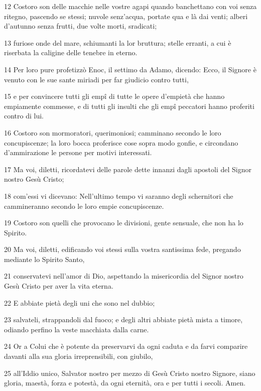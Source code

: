 \par 12 Costoro son delle macchie nelle vostre agapi quando banchettano con voi senza ritegno, pascendo se stessi; nuvole senz'acqua, portate qua e là dai venti; alberi d'autunno senza frutti, due volte morti, sradicati;
\par 13 furiose onde del mare, schiumanti la lor bruttura; stelle erranti, a cui è riserbata la caligine delle tenebre in eterno.
\par 14 Per loro pure profetizzò Enoc, il settimo da Adamo, dicendo: Ecco, il Signore è venuto con le sue sante miriadi per far giudicio contro tutti,
\par 15 e per convincere tutti gli empî di tutte le opere d'empietà che hanno empiamente commesse, e di tutti gli insulti che gli empî peccatori hanno proferiti contro di lui.
\par 16 Costoro son mormoratori, querimoniosi; camminano secondo le loro concupiscenze; la loro bocca proferisce cose sopra modo gonfie, e circondano d'ammirazione le persone per motivi interessati.
\par 17 Ma voi, diletti, ricordatevi delle parole dette innanzi dagli apostoli del Signor nostro Gesù Cristo;
\par 18 com'essi vi dicevano: Nell'ultimo tempo vi saranno degli schernitori che cammineranno secondo le loro empie concupiscenze.
\par 19 Costoro son quelli che provocano le divisioni, gente sensuale, che non ha lo Spirito.
\par 20 Ma voi, diletti, edificando voi stessi sulla vostra santissima fede, pregando mediante lo Spirito Santo,
\par 21 conservatevi nell'amor di Dio, aspettando la misericordia del Signor nostro Gesù Cristo per aver la vita eterna.
\par 22 E abbiate pietà degli uni che sono nel dubbio;
\par 23 salvateli, strappandoli dal fuoco; e degli altri abbiate pietà mista a timore, odiando perfino la veste macchiata dalla carne.
\par 24 Or a Colui che è potente da preservarvi da ogni caduta e da farvi comparire davanti alla sua gloria irreprensibili, con giubilo,
\par 25 all'Iddio unico, Salvator nostro per mezzo di Gesù Cristo nostro Signore, siano gloria, maestà, forza e potestà, da ogni eternità, ora e per tutti i secoli. Amen.


